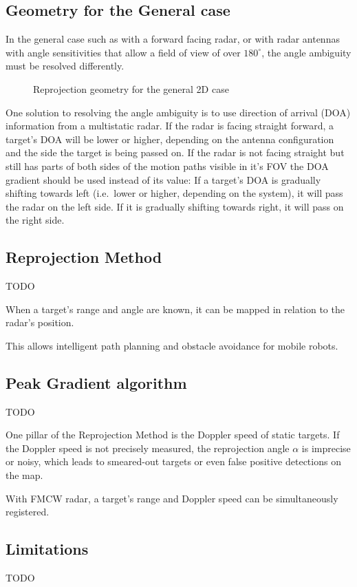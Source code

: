 \subsection{Geometry for the General
case}\label{geometry-for-the-general-case}

In the general case such as with a forward facing radar, or with radar
antennas with angle sensitivities that allow a field of view of over
\(180^\circ\), the angle ambiguity must be resolved differently.

\begin{figure}[htp]
    \centering
    \label{fig:geometry_general}
    \def\svgwidth{\linewidth}
    
    \caption{Reprojection geometry for the general 2D case}
\end{figure}

One solution to resolving the angle ambiguity is to use direction of
arrival (DOA) information from a multistatic radar. If the radar is
facing straight forward, a target's DOA will be lower or higher,
depending on the antenna configuration and the side the target is being
passed on. If the radar is not facing straight but still has parts of
both sides of the motion paths visible in it's FOV the DOA gradient
should be used instead of its value: If a target's DOA is gradually
shifting towards left (i.e.~lower or higher, depending on the system),
it will pass the radar on the left side. If it is gradually shifting
towards right, it will pass on the right side.

\subsection{Reprojection Method}\label{reprojection-method}

TODO

When a target's range and angle are known, it can be mapped in relation
to the radar's position.

This allows intelligent path planning and obstacle avoidance for mobile
robots.



\subsection{Peak Gradient algorithm}\label{peak-gradient-algorithm}

TODO

One pillar of the Reprojection Method is the Doppler speed of static
targets. If the Doppler speed is not precisely measured, the
reprojection angle \(\alpha\) is imprecise or noisy, which leads to
smeared-out targets or even false positive detections on the map.

With FMCW radar, a target's range and Doppler speed can be
simultaneously registered.

\subsection{Limitations}\label{limitations}


TODO

